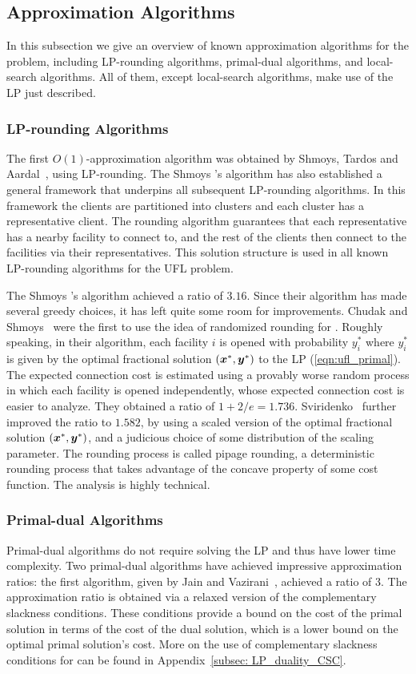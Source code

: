 \documentclass[oneside,final]{ucr}
\begin{document}
\subsection{Approximation Algorithms}
In this subsection we give an overview of known
approximation algorithms for the {\UFL} problem, including
LP-rounding algorithms, primal-dual algorithms, and
local-search algorithms. All of them, except local-search
algorithms, make use of the LP just described.

\subsubsection{LP-rounding Algorithms}
The first $O(1)$-approximation algorithm was obtained by
Shmoys, Tardos and Aardal~\cite{ShmoysTA97}, using
LP-rounding. The Shmoys {\etal}'s algorithm has also
established a general framework that underpins all
subsequent LP-rounding algorithms. In this framework the
clients are partitioned into clusters and each cluster has
a representative client. The rounding algorithm guarantees
that each representative has a nearby facility to connect
to, and the rest of the clients then connect to the
facilities via their representatives. This solution
structure is used in all known LP-rounding algorithms for
the UFL problem.

The Shmoys {\etal}'s algorithm achieved a ratio of
$3.16$. Since their algorithm has made several greedy
choices, it has left quite some room for
improvements. Chudak and Shmoys~\cite{ChudakS04} were the
first to use the idea of randomized rounding for
{\UFL}. Roughly speaking, in their algorithm, each facility
$i$ is opened with probability $y_i^\ast$ where $y_i^\ast$ is
given by the optimal fractional solution
$(\boldsymbol{x}^\ast,\boldsymbol{y}^\ast)$ to the LP
(\ref{eqn:ufl_primal}). The expected connection cost is
estimated using a provably worse random process in which
each facility is opened independently, whose expected
connection cost is easier to analyze. They obtained a ratio
of $1+2/e = 1.736$. Sviridenko~\cite{Svi02} further improved
the ratio to $1.582$, by using a scaled version of the
optimal fractional solution $(\boldsymbol{x}^\ast,\boldsymbol{y}^\ast)$, and a
judicious choice of some distribution of the scaling
parameter. The rounding process is called pipage rounding, a
deterministic rounding process that takes advantage of the
concave property of some cost function. The analysis is
highly technical.

\subsubsection{Primal-dual Algorithms}
Primal-dual algorithms do not require solving the LP and
thus have lower time complexity. Two primal-dual algorithms
have achieved impressive approximation ratios: the first
algorithm, given by Jain and Vazirani~\cite{JainV01},
achieved a ratio of $3$. The approximation ratio is obtained
via a relaxed version of the complementary slackness
conditions. These conditions provide a bound on the cost of
the primal solution in terms of the cost of the dual
solution, which is a lower bound on the optimal primal
solution's cost. More on the use of complementary slackness
conditions for {\UFL} can be found in Appendix~\ref{subsec:
  LP_duality_CSC}.
\end{document}
